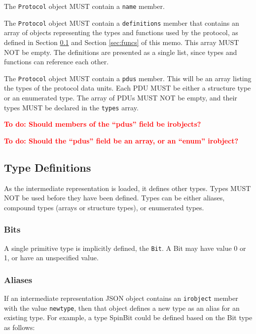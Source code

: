\documentclass[twocolumn,a4paper]{article}
\newcommand{\todo}[1]{\textbf{\textcolor{red}{To do: #1}}}
\begin{document}
The \texttt{Protocol} object MUST contain a \texttt{name} member.

The \texttt{Protocol} object MUST contain a \texttt{definitions} member
that contains an array of objects representing the types and functions
used by the protocol, as defined in Section \ref{sec:types} and Section
\ref{sec:funcs} of this memo. This array MUST NOT be empty. The definitions
are presented as a single list, since types and functions can reference
each other.

The \texttt{Protocol} object MUST contain a \texttt{pdus} member. This
will be an array listing the types of the protocol data units. Each PDU
MUST be either a structure type or an enumerated type. The array of PDUs
MUST NOT be empty, and their types MUST be declared in the \texttt{types}
array.

\todo{Should members of the ``pdus'' field be irobjects?}

\todo{Should the ``pdus'' field be an array, or an ``enum'' irobject?}

\subsection{Type Definitions}
\label{sec:types}

As the intermediate representation is loaded, it defines other types. Types
MUST NOT be used before they have been defined.
Types can be either aliases, compound types (arrays or structure types), or
enumerated types.

\subsubsection{Bits}

A single primitive type is implicitly defined, the \texttt{Bit}.
A Bit may have value 0 or 1, or have an unspecified value. 

\subsubsection{Aliases}

If an intermediate representation JSON object contains an \texttt{irobject}
member with the value \texttt{newtype}, then that object defines a new type
as an alias for an existing type. For example, a type SpinBit could be
defined based on the Bit type as follows:
\end{document}
